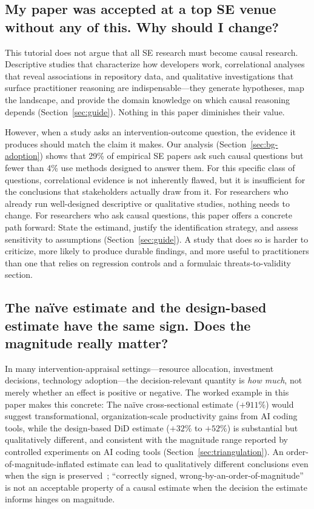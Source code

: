 \subsection{My paper was accepted at a top SE venue without any of this. Why should I change?}

This tutorial does not argue that all SE research must become causal research.
Descriptive studies that characterize how developers work, correlational analyses that reveal associations in repository data, and qualitative investigations that surface practitioner reasoning are indispensable---they generate hypotheses, map the landscape, and provide the domain knowledge on which causal reasoning depends (Section~\ref{sec:guide}).
Nothing in this paper diminishes their value.

However, when a study asks an intervention-outcome question, the evidence it produces should match the claim it makes.
Our analysis (Section~\ref{sec:bg-adoption}) shows that 29\% of empirical SE papers ask such causal questions but fewer than 4\% use methods designed to answer them.
For this specific class of questions, correlational evidence is not inherently flawed, but it is insufficient for the conclusions that stakeholders actually draw from it.
For researchers who already run well-designed descriptive or qualitative studies, nothing needs to change.
For researchers who ask causal questions, this paper offers a concrete path forward: State the estimand, justify the identification strategy, and assess sensitivity to assumptions (Section~\ref{sec:guide}).
A study that does so is harder to criticize, more likely to produce durable findings, and more useful to practitioners than one that relies on regression controls and a formulaic threats-to-validity section.

\subsection{The na\"ive estimate and the design-based estimate have the same sign. Does the magnitude really matter?}

In many intervention-appraisal settings---resource allocation, investment decisions, technology adoption---the decision-relevant quantity is \emph{how much}, not merely whether an effect is positive or negative.
The worked example in this paper makes this concrete: The na\"ive cross-sectional estimate ($+911\%$) would suggest transformational, organization-scale productivity gains from AI coding tools, while the design-based DiD estimate ($+32\%$ to $+52\%$) is substantial but qualitatively different, and consistent with the magnitude range reported by controlled experiments on AI coding tools (Section~\ref{sec:triangulation}).
An order-of-magnitude-inflated estimate can lead to qualitatively different conclusions even when the sign is preserved~\cite{lundberg2021estimand}; ``correctly signed, wrong-by-an-order-of-magnitude'' is not an acceptable property of a causal estimate when the decision the estimate informs hinges on magnitude.

